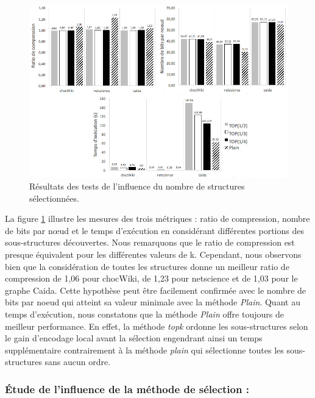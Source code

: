 		
		\begin{figure}[H]
	
			
			\includegraphics[scale=0.6]{ressources/image/vogStat.jpg}
			
			\caption{Résultats des tests de l'influence du nombre de structures sélectionnées.}
			\label{fig:test-select}
	
	\end{figure}
	
	La figure \ref{fig:test-select} illustre les mesures des trois métriques : ratio de compression, nombre de bits par nœud et le temps d'exécution en considérant différentes portions des sous-structures découvertes. Nous remarquons que le ratio de compression est presque équivalent pour les différentes valeurs de k. Cependant, nous observons bien que la considération de toutes les structures donne un meilleur ratio de compression de 1,06 pour chocWiki, de 1,23 pour netscience et de 1,03 pour le graphe Caida. Cette hypothèse peut être facilement confirmée avec le nombre de bits par noeud qui atteint sa valeur minimale avec la méthode \textit{Plain}. Quant au temps d'exécution, nous constatons  que la méthode \textit{Plain} offre toujours de meilleur performance. En effet, la méthode \textit{topk} ordonne les sous-structures selon le gain d'encodage local avant la sélection engendrant ainsi un temps supplémentaire contrairement à la méthode \textit{plain} qui sélectionne toutes les sous-structures sans aucun ordre. 
		
		\subsubsection{Étude de l'influence de la méthode de sélection :}
		
